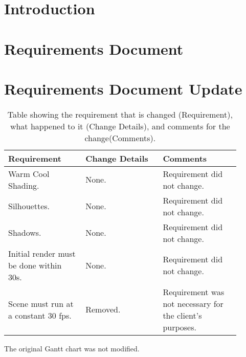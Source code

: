 \documentclass[10pt,journal,compsoc,draftclsnofoot]{IEEEtran}
\begin{document}
\begin{flushleft}

\tableofcontents

\newpage

\section{Introduction}


\newpage

\section{Requirements Document}

\newpage



\section{Requirements Document Update}

\begin{center}
\begin{table}[H]
\caption{Table showing the requirement that is changed (Requirement), what happened to it (Change Details), and comments for the change(Comments).}
\begin{tabular}{ | p{0.3\linewidth} | p{0.3\linewidth} | p{0.3\linewidth} | }
\hline
\textbf{Requirement}  & \textbf{Change Details}  & \textbf{Comments} \\ \hline

Warm Cool Shading. & 
None. & 
Requirement did not change. \\ \hline
Silhouettes. & 
None. & 
Requirement did not change. \\ \hline
Shadows. & 
None. & 
Requirement did not change. \\ \hline
Initial render must be done within 30s. & 
None. & 
Requirement did not change. \\ \hline
Scene must run at a constant 30 fps. & 
Removed. & 
Requirement was not necessary for the client's purposes. \\ \hline

\end{tabular}
\newline
\label{table:RequirementsDocumentUpdate}
\end{table}
\end{center}

The original Gantt chart was not modified.


\end{flushleft}
\end{document}
